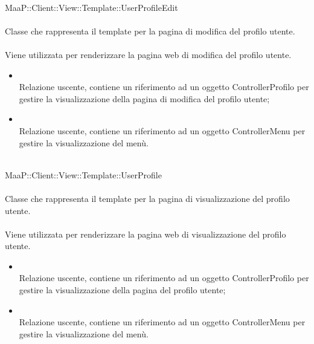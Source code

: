 	\\
	MaaP::Client::View::Template::UserProfileEdit\\
	\\
	Classe che rappresenta il template per la pagina di modifica del profilo utente.\\
	\\
	Viene utilizzata per renderizzare la pagina web di modifica del profilo utente.\\
	\begin{itemize}
	\item{}\\
	Relazione uscente, contiene un riferimento ad un oggetto ControllerProfilo per gestire la visualizzazione della pagina di modifica del profilo utente;
	\item{}\\
	Relazione uscente, contiene un riferimento ad un oggetto ControllerMenu per gestire la visualizzazione del menù.
	\end{itemize}
	
	\\
	MaaP::Client::View::Template::UserProfile\\
	\\
	Classe che rappresenta il template per la pagina di visualizzazione del profilo utente.\\
	\\
	Viene utilizzata per renderizzare la pagina web di visualizzazione del profilo utente.\\
	\begin{itemize}
	\item{}\\
	Relazione uscente, contiene un riferimento ad un oggetto ControllerProfilo per gestire la visualizzazione della pagina del profilo utente;
	\item{}\\
	Relazione uscente, contiene un riferimento ad un oggetto ControllerMenu per gestire la visualizzazione del menù.
	\end{itemize}

